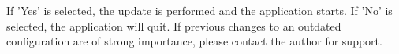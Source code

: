 If 'Yes' is selected, the update is performed and the application starts. If 'No' is selected, the application will quit. If previous changes to an outdated configuration are of strong importance, please contact the author for support. 

























